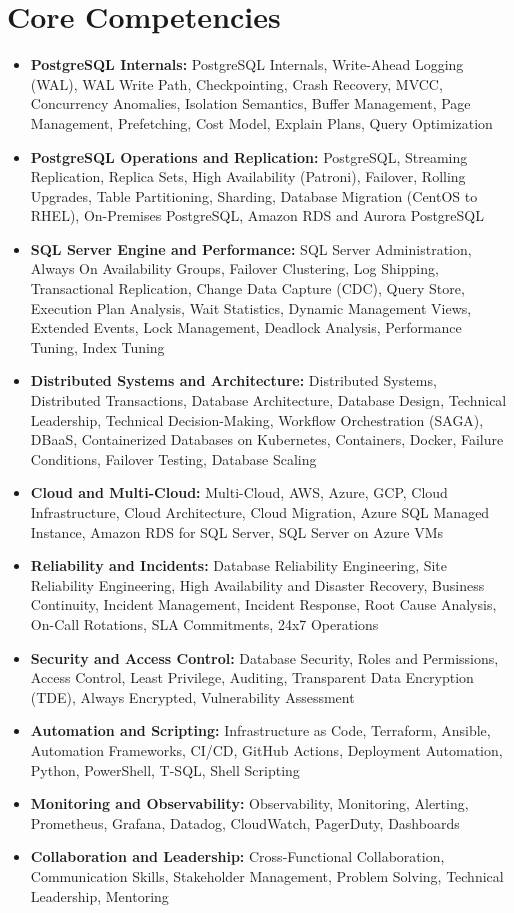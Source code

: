 \documentclass[10pt,a4paper]{article}
\begin{document}
\section{Core Competencies}
\begin{itemize}
  \item \textbf{PostgreSQL Internals:} PostgreSQL Internals, Write-Ahead Logging (WAL), WAL Write Path, Checkpointing, Crash Recovery, MVCC, Concurrency Anomalies, Isolation Semantics, Buffer Management, Page Management, Prefetching, Cost Model, Explain Plans, Query Optimization
  \item \textbf{PostgreSQL Operations and Replication:} PostgreSQL, Streaming Replication, Replica Sets, High Availability (Patroni), Failover, Rolling Upgrades, Table Partitioning, Sharding, Database Migration (CentOS to RHEL), On-Premises PostgreSQL, Amazon RDS and Aurora PostgreSQL
  \item \textbf{SQL Server Engine and Performance:} SQL Server Administration, Always On Availability Groups, Failover Clustering, Log Shipping, Transactional Replication, Change Data Capture (CDC), Query Store, Execution Plan Analysis, Wait Statistics, Dynamic Management Views, Extended Events, Lock Management, Deadlock Analysis, Performance Tuning, Index Tuning
  \item \textbf{Distributed Systems and Architecture:} Distributed Systems, Distributed Transactions, Database Architecture, Database Design, Technical Leadership, Technical Decision-Making, Workflow Orchestration (SAGA), DBaaS, Containerized Databases on Kubernetes, Containers, Docker, Failure Conditions, Failover Testing, Database Scaling
  \item \textbf{Cloud and Multi-Cloud:} Multi-Cloud, AWS, Azure, GCP, Cloud Infrastructure, Cloud Architecture, Cloud Migration, Azure SQL Managed Instance, Amazon RDS for SQL Server, SQL Server on Azure VMs
  \item \textbf{Reliability and Incidents:} Database Reliability Engineering, Site Reliability Engineering, High Availability and Disaster Recovery, Business Continuity, Incident Management, Incident Response, Root Cause Analysis, On-Call Rotations, SLA Commitments, 24x7 Operations
  \item \textbf{Security and Access Control:} Database Security, Roles and Permissions, Access Control, Least Privilege, Auditing, Transparent Data Encryption (TDE), Always Encrypted, Vulnerability Assessment
  \item \textbf{Automation and Scripting:} Infrastructure as Code, Terraform, Ansible, Automation Frameworks, CI/CD, GitHub Actions, Deployment Automation, Python, PowerShell, T-SQL, Shell Scripting
  \item \textbf{Monitoring and Observability:} Observability, Monitoring, Alerting, Prometheus, Grafana, Datadog, CloudWatch, PagerDuty, Dashboards
  \item \textbf{Collaboration and Leadership:} Cross-Functional Collaboration, Communication Skills, Stakeholder Management, Problem Solving, Technical Leadership, Mentoring
\end{itemize}
\end{document}
